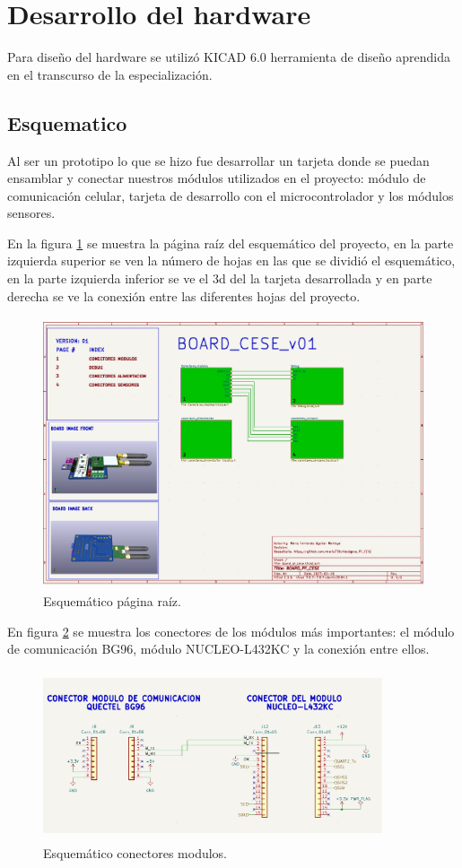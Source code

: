 \section{Desarrollo del hardware}

Para diseño del hardware se utilizó KICAD 6.0 herramienta de diseño aprendida en el transcurso de  la especialización.

\subsection{Esquematico} 
Al ser un prototipo lo que se hizo fue desarrollar un tarjeta donde se puedan ensamblar y conectar nuestros módulos utilizados en el proyecto: módulo de comunicación celular, tarjeta de desarrollo con el microcontrolador y  los módulos sensores.

En la figura \ref{fig:esquematico root} se muestra la página raíz del esquemático del proyecto, en la parte izquierda superior se  ven la número de hojas en las que se dividió el esquemático, en la parte izquierda inferior se ve el 3d del la tarjeta desarrollada y en parte derecha se ve la conexión entre las diferentes hojas del proyecto.

\begin{figure}[h]
  \centering
	\includegraphics[width=\textwidth, height=8cm]{./Figures/esquematico_root.png}
	\caption{Esquemático página raíz.}
	\label{fig:esquematico root}
\end{figure}

En figura \ref{fig:esquematico modulos} se muestra los conectores de los módulos más importantes: el módulo de comunicación BG96, módulo NUCLEO-L432KC y la conexión entre ellos.

\begin{figure}[h]
  \centering
	\includegraphics[width=10cm, height=5cm]{./Figures/esquematico_modulos.png}
	\caption{Esquemático conectores modulos.}
	\label{fig:esquematico modulos}
\end{figure}


